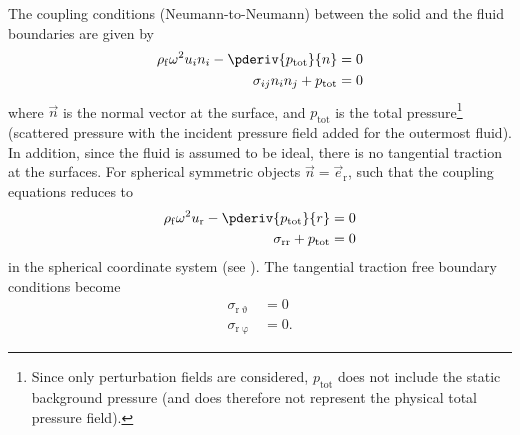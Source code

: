 The coupling conditions (Neumann-to-Neumann) between the solid and the fluid boundaries are given by~\cite[pp. 13-14]{Ihlenburg1998fea}
\begin{align}
	\rho_{\mathrm{f}} \omega^2 u_i n_i - \pderiv{p_{\mathrm{tot}}}{n} &= 0\\
	\sigma_{ij}n_i n_j + p_{\mathrm{tot}} &= 0
\end{align}
where $\vec{n}$ is the normal vector at the surface, and $p_{\mathrm{tot}}$ is the total pressure\footnote{Since only perturbation fields are considered, $p_{\mathrm{tot}}$ does not include the static background pressure (and does therefore not represent the physical total pressure field).} (scattered pressure with the incident pressure field added for the outermost fluid). In addition, since the fluid is assumed to be ideal, there is no tangential traction at the surfaces. For spherical symmetric objects $\vec{n}=\vec{e}_{\mathrm{r}}$, such that the coupling equations reduces to
\begin{align}
	\rho_{\mathrm{f}} \omega^2 u_{\mathrm{r}} - \pderiv{p_{\mathrm{tot}}}{r} &= 0\label{Eq1:firstBC}\\
	\sigma_{\mathrm{rr}} + p_{\mathrm{tot}} &= 0\label{Eq1:secondBC}
\end{align}
in the spherical coordinate system (see ). The tangential traction free boundary conditions become~\cite[p. 15]{Chang1994voa}
\begin{align}
	\sigma_{\mathrm{r}\upvartheta} &= 0\label{Eq1:traction1}\\
	\sigma_{\mathrm{r}\upvarphi} &= 0\label{Eq1:traction2}.
\end{align}